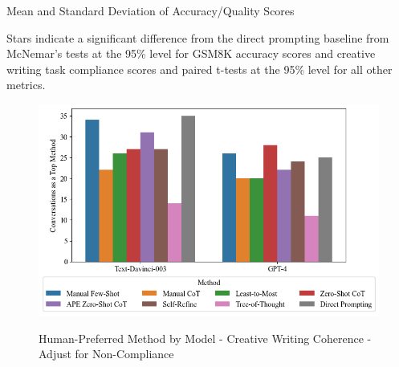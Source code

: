 \documentclass[11pt]{article}
\begin{document}
\begin{centering}


  


  \begin{table}
    \caption{Mean and Standard Deviation of Accuracy/Quality Scores}
    \centering
    \tiny
      
    \label{tab:accuracy_quality}
    \newline \newline \footnotesize Stars indicate a significant difference from the direct prompting baseline from McNemar's tests at the 95\% level for GSM8K accuracy scores and creative writing task compliance scores and paired t-tests at the 95\% level for all other metrics.
  \end{table}

  \begin{figure}
    \caption{Human-Preferred Method by Model - Creative Writing Coherence - Adjust for Non-Compliance}
    \centering
    \includegraphics[width=\textwidth]{../Output/cw_preference_plot_coherence_1_incoherent_10_very_coherent_compliance_adjusted.png}
    \label{fig:cw_preference_plot_ca}
  \end{figure}


\end{centering}
\end{document}
